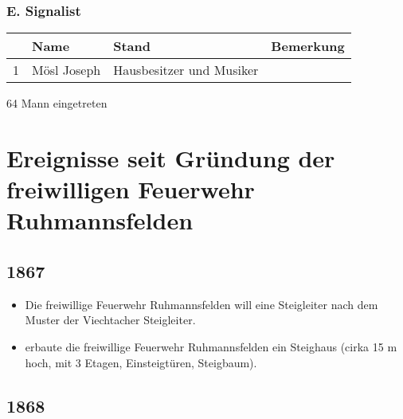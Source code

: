 \documentclass[12pt,a4paper]{book}
\begin{document}
\subsection*{E. Signalist}

\begin{tabular}{rlll}
& Name & Stand & Bemerkung\\
\hline
1 & Mösl Joseph & Hausbesitzer und Musiker\\
\end{tabular}

64 Mann eingetreten

\chapter[Ereignisse seit Gründung]{Ereignisse seit Gründung der
freiwilligen Feuerwehr Ruhmannsfelden}

\section*{1867}

\begin{itemize}
\item Die freiwillige Feuerwehr Ruhmannsfelden will eine Steigleiter
nach dem Muster der Viechtacher Steigleiter.

\item erbaute die freiwillige Feuerwehr Ruhmannsfelden ein Steighaus
(cirka 15 m hoch, mit 3 Etagen, Einsteigtüren, Steigbaum).
\end{itemize}

\section*{1868}
\end{document}
